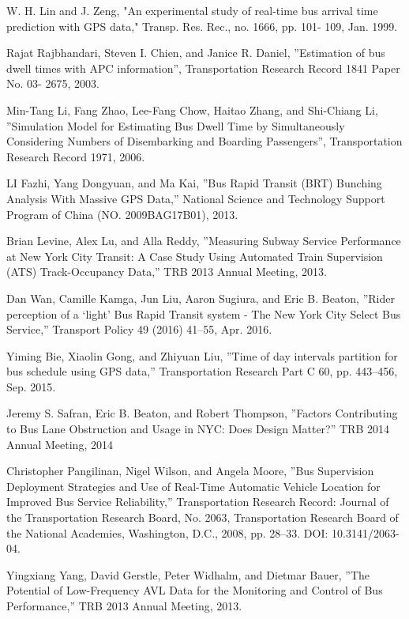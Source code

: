 \documentclass[12pt]{report}
\begin{document}
\begin{thebibliography}{14}

W. H. Lin and J. Zeng, "An experimental study of real-time bus arrival time prediction with GPS data," Transp. Res. Rec., no. 1666, pp. 101- 109, Jan. 1999.

Rajat Rajbhandari, Steven I. Chien, and Janice R. Daniel, ''Estimation of bus dwell times with APC information'', Transportation Research Record 1841 Paper No. 03- 2675, 2003.

Min-Tang Li, Fang Zhao, Lee-Fang Chow, Haitao Zhang, and Shi-Chiang Li, ''Simulation Model for Estimating Bus Dwell Time by Simultaneously Considering Numbers of Disembarking and Boarding Passengers'', Transportation Research Record 1971, 2006.

LI Fazhi, Yang Dongyuan, and Ma Kai, ''Bus Rapid Transit (BRT) Bunching Analysis With Massive GPS Data,'' National Science and Technology Support Program of China (NO. 2009BAG17B01), 2013.

Brian Levine, Alex Lu, and Alla Reddy, ''Measuring Subway Service Performance at New York City Transit: A Case Study Using Automated Train Supervision (ATS) Track-Occupancy Data,'' TRB 2013 Annual Meeting, 2013.

Dan Wan, Camille Kamga, Jun Liu, Aaron Sugiura, and Eric B. Beaton, ''Rider perception of a ‘light' Bus Rapid Transit system - The New York City Select Bus Service,'' Transport Policy 49 (2016) 41–55, Apr. 2016.


Yiming Bie, Xiaolin Gong, and Zhiyuan Liu, ''Time of day intervals partition for bus schedule using GPS data,'' Transportation Research Part C 60, pp. 443–456, Sep. 2015.

Jeremy S. Safran, Eric B. Beaton, and Robert Thompson, ''Factors Contributing to Bus Lane Obstruction and Usage in NYC: Does Design Matter?'' TRB 2014 Annual Meeting, 2014

Christopher Pangilinan, Nigel Wilson, and Angela Moore, ''Bus Supervision Deployment Strategies and Use of Real-Time Automatic
Vehicle Location for Improved Bus Service Reliability,'' Transportation Research Record: Journal of the Transportation Research Board, No. 2063, Transportation Research Board of the National Academies, Washington, D.C., 2008, pp. 28–33. DOI: 10.3141/2063-04.

Yingxiang Yang, David Gerstle, Peter Widhalm, and Dietmar Bauer, ''The Potential of Low-Frequency AVL Data for the Monitoring and Control of Bus Performance,'' TRB 2013 Annual Meeting, 2013.


\end{thebibliography}
\end{document}
